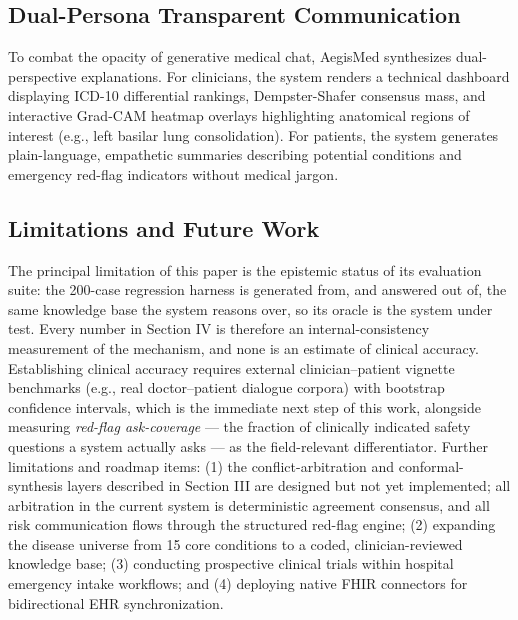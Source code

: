 \documentclass[10pt,twocolumn]{article}
\begin{document}
\subsection{Dual-Persona Transparent Communication}
To combat the opacity of generative medical chat, AegisMed synthesizes dual-perspective explanations. For clinicians, the system renders a technical dashboard displaying ICD-10 differential rankings, Dempster-Shafer consensus mass, and interactive Grad-CAM heatmap overlays highlighting anatomical regions of interest (e.g., left basilar lung consolidation). For patients, the system generates plain-language, empathetic summaries describing potential conditions and emergency red-flag indicators without medical jargon.

\subsection{Limitations and Future Work}
The principal limitation of this paper is the epistemic status of its evaluation suite: the 200-case regression harness is generated from, and answered out of, the same knowledge base the system reasons over, so its oracle is the system under test. Every number in Section IV is therefore an internal-consistency measurement of the mechanism, and none is an estimate of clinical accuracy. Establishing clinical accuracy requires external clinician--patient vignette benchmarks (e.g., real doctor--patient dialogue corpora) with bootstrap confidence intervals, which is the immediate next step of this work, alongside measuring \emph{red-flag ask-coverage} --- the fraction of clinically indicated safety questions a system actually asks --- as the field-relevant differentiator. Further limitations and roadmap items: (1) the conflict-arbitration and conformal-synthesis layers described in Section III are designed but not yet implemented; all arbitration in the current system is deterministic agreement consensus, and all risk communication flows through the structured red-flag engine; (2) expanding the disease universe from 15 core conditions to a coded, clinician-reviewed knowledge base; (3) conducting prospective clinical trials within hospital emergency intake workflows; and (4) deploying native FHIR connectors for bidirectional EHR synchronization.

\end{document}
